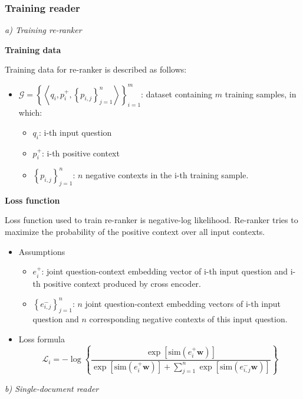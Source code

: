 \documentclass[3p, sort&compress, 12pt]{elsarticle}
\begin{document}
\subsubsection{Training reader}
\par \textit{a) Training re-ranker}
\par \textbf{Training data}
\par Training data for re-ranker is described as follows:
\begin{itemize}
	\item 
	$\mathcal{G} = \left\{\left\langle q_i, p_i^+, \left\{p_{i, j}\right\}_{j=1}^n\right\rangle\right\}_{i=1}^m$: dataset containing $m$ training samples, in which:
	\begin{itemize}
		\item $q_i$: i-th input question
		\item $p_i^+$: i-th positive context
		\item $\left\{p_{i,j}\right\}_{j=1}^n$: $n$ negative contexts in the i-th training sample.
	\end{itemize}
\end{itemize}
\par \textbf{Loss function}
\par Loss function used to train re-ranker is negative-log likelihood. Re-ranker tries to maximize the probability of the positive context over all input contexts. 
\begin{itemize}
	\item Assumptions
	\begin{itemize}
		\item $e_i^+$: joint question-context embedding vector of i-th input question and i-th positive context produced by cross encoder.
		\item $\left\{e_{i, j}^-\right\}_{j=1}^n$: $n$ joint question-context embedding vectors of i-th input question and $n$ corresponding negative contexts of this input question. 
	\end{itemize}
	\item Loss formula \\[10pt]
	\begin{equation}
		\label{eq:04}
		\mathcal{L}_i =-\log\left\{ \dfrac{\exp\left[\text{sim}\left(e^+_i\mathbf{w}\right)\right]}{\exp\left[\text{sim}\left(e^+_i\mathbf{w}\right)\right] + \sum\limits_{j=1}^n\exp\left[\text{sim}\left(e^-_{i,j}\mathbf{w}\right)\right]}\right\}
	\end{equation}
\end{itemize}
\par \textit{b) Single-document reader}
\end{document}
